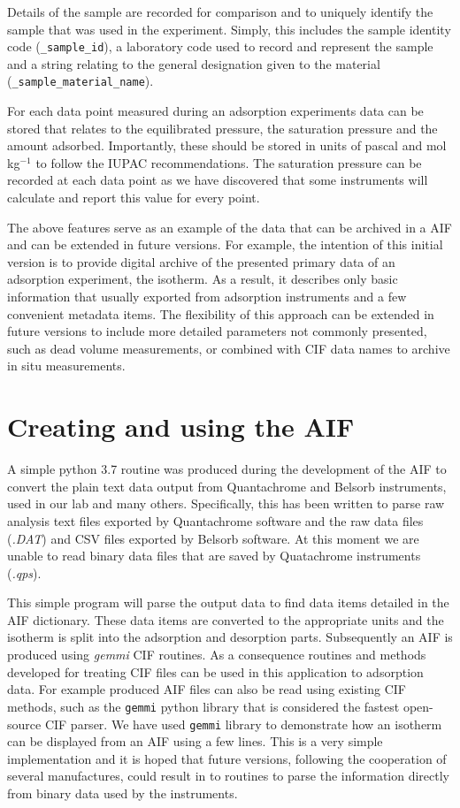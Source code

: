\documentclass[journal=langd5,manuscript=article]{achemso}
\begin{document}
Details of the sample are recorded for comparison and to uniquely identify the sample that was used in the experiment.
Simply, this includes the sample identity code (\texttt{\_sample\_id}), a laboratory code used to record and represent the sample and a string relating to the general designation given to the material (\texttt{\_sample\_material\_name}).

For each data point measured during an adsorption experiments data can be stored that relates to the equilibrated pressure, the saturation pressure and the amount adsorbed. Importantly, these should be stored in units of pascal and mol$\,$kg$^{-1}$ to follow the IUPAC recommendations.\cite{10.1515/pac-2014-1117}
The saturation pressure can be recorded at each data point as we have discovered that some instruments will calculate and report this value for every point.

The above features serve as an example of the data that can be archived in a AIF and can be extended in future versions.
For example, the intention of this initial version is to provide digital archive of the presented primary data of an adsorption experiment, the isotherm.
As a result, it describes only basic information that usually exported from adsorption instruments and a few convenient metadata items.
The flexibility of this approach can be extended in future versions to include more detailed parameters not commonly presented, such as dead volume measurements, or combined with CIF data names to archive in situ measurements.

\section{Creating and using the AIF}
A simple python 3.7 routine was produced during the development of the AIF to convert the plain text data output from Quantachrome and Belsorb instruments, used in our lab and many others.
Specifically, this has been written to parse raw analysis text files exported by Quantachrome software and the raw data files (\textit{.DAT}) and CSV files exported by Belsorb software.
At this moment we are unable to read binary data files that are saved by Quatachrome instruments (\textit{.qps}).

This simple program will parse the output data to find data items detailed in the AIF dictionary.
These data items are converted to the appropriate units and the isotherm is split into the adsorption and desorption parts.
Subsequently an AIF is produced using \textit{gemmi} CIF routines.\cite{gemmi}
As a consequence routines and methods developed for treating CIF files can be used in this application to adsorption data.
For example produced AIF files can also be read using existing CIF methods, such as the \texttt{gemmi} python library that is considered the fastest open-source CIF parser.\cite{gemmi}
We have used \texttt{gemmi} library to demonstrate how an isotherm can be displayed from an AIF using a few lines.
This is a very simple implementation and it is hoped that future versions, following the cooperation of several manufactures, could result in to routines to parse the information directly from binary data used by the instruments.
\end{document}
